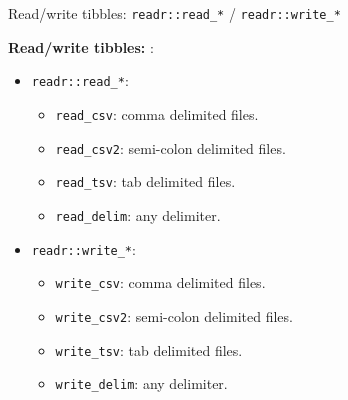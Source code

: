 \documentclass[14pt,ignorenonframetext,]{bredelebeamer}
\providecommand{\tightlist}{%
  \setlength{\itemsep}{0pt}\setlength{\parskip}{0pt}}
\begin{document}
\begin{frame}[fragile]{Read/write tibbles: \texttt{readr::read\_*} /
\texttt{readr::write\_*}}

\Huge
\textbf{Read/write tibbles:} :

\begin{itemize}
\item
  \texttt{readr::read\_*}:

  \begin{itemize}
  \tightlist
  \item
    \texttt{read\_csv}: comma delimited files.
  \item
    \texttt{read\_csv2}: semi-colon delimited files.
  \item
    \texttt{read\_tsv}: tab delimited files.
  \item
    \texttt{read\_delim}: any delimiter.
  \end{itemize}
\item
  \texttt{readr::write\_*}:

  \begin{itemize}
  \tightlist
  \item
    \texttt{write\_csv}: comma delimited files.
  \item
    \texttt{write\_csv2}: semi-colon delimited files.
  \item
    \texttt{write\_tsv}: tab delimited files.
  \item
    \texttt{write\_delim}: any delimiter.
  \end{itemize}
\end{itemize}

\end{frame}
\end{document}
